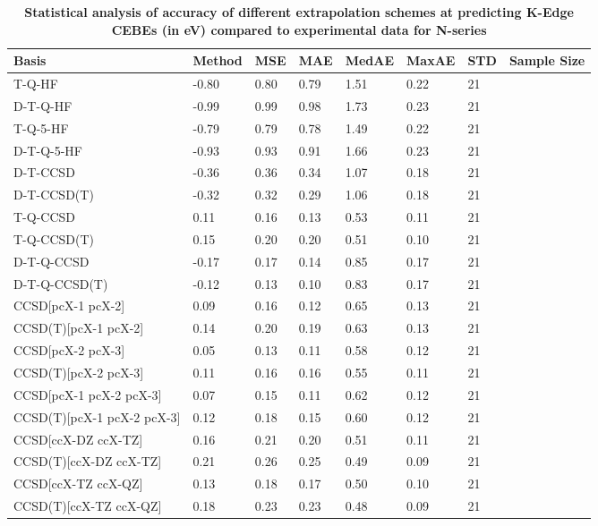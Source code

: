 \begin{table}
  \caption{\textbf{Statistical analysis of accuracy of different extrapolation schemes at predicting K-Edge CEBEs (in eV) compared to experimental data for N-series}}
  \label{tbl:extrap-scheme-summary-n}
  \begin{tabular}{l l l l l l l l }
    \toprule
    \textbf{Basis} & \textbf{Method} & \textbf{MSE} & \textbf{MAE} & \textbf{MedAE} & \textbf{MaxAE} & \textbf{STD} & \textbf{Sample Size} \\ 
    \midrule
    T-Q-HF & -0.80 & 0.80 & 0.79 & 1.51 & 0.22 & 21 \\ 
    D-T-Q-HF & -0.99 & 0.99 & 0.98 & 1.73 & 0.23 & 21 \\ 
    T-Q-5-HF & -0.79 & 0.79 & 0.78 & 1.49 & 0.22 & 21 \\ 
    D-T-Q-5-HF & -0.93 & 0.93 & 0.91 & 1.66 & 0.23 & 21 \\ 
    D-T-CCSD & -0.36 & 0.36 & 0.34 & 1.07 & 0.18 & 21 \\ 
    D-T-CCSD(T) & -0.32 & 0.32 & 0.29 & 1.06 & 0.18 & 21 \\ 
    T-Q-CCSD & 0.11 & 0.16 & 0.13 & 0.53 & 0.11 & 21 \\ 
    T-Q-CCSD(T) & 0.15 & 0.20 & 0.20 & 0.51 & 0.10 & 21 \\ 
    D-T-Q-CCSD & -0.17 & 0.17 & 0.14 & 0.85 & 0.17 & 21 \\ 
    D-T-Q-CCSD(T) & -0.12 & 0.13 & 0.10 & 0.83 & 0.17 & 21 \\ 
    CCSD[pcX-1 pcX-2] & 0.09 & 0.16 & 0.12 & 0.65 & 0.13 & 21 \\ 
    CCSD(T)[pcX-1 pcX-2] & 0.14 & 0.20 & 0.19 & 0.63 & 0.13 & 21 \\ 
    CCSD[pcX-2 pcX-3] & 0.05 & 0.13 & 0.11 & 0.58 & 0.12 & 21 \\ 
    CCSD(T)[pcX-2 pcX-3] & 0.11 & 0.16 & 0.16 & 0.55 & 0.11 & 21 \\ 
    CCSD[pcX-1 pcX-2 pcX-3] & 0.07 & 0.15 & 0.11 & 0.62 & 0.12 & 21 \\ 
    CCSD(T)[pcX-1 pcX-2 pcX-3] & 0.12 & 0.18 & 0.15 & 0.60 & 0.12 & 21 \\ 
    CCSD[ccX-DZ ccX-TZ] & 0.16 & 0.21 & 0.20 & 0.51 & 0.11 & 21 \\ 
    CCSD(T)[ccX-DZ ccX-TZ] & 0.21 & 0.26 & 0.25 & 0.49 & 0.09 & 21 \\ 
    CCSD[ccX-TZ ccX-QZ] & 0.13 & 0.18 & 0.17 & 0.50 & 0.10 & 21 \\ 
    CCSD(T)[ccX-TZ ccX-QZ] & 0.18 & 0.23 & 0.23 & 0.48 & 0.09 & 21 \\ 

\end{tabular}
\end{table}
